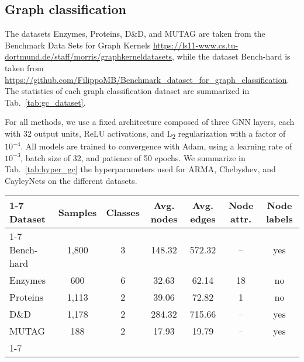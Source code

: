 \documentclass{article}
\begin{document}
\subsection{Graph classification}

The datasets Enzymes, Proteins, D\&D, and MUTAG are taken from the Benchmark Data Sets for Graph Kernels \url{https://ls11-www.cs.tu-dortmund.de/staff/morris/graphkerneldatasets}, while the dataset Bench-hard is taken from \url{https://github.com/FilippoMB/Benchmark_dataset_for_graph_classification}.
The statistics of each graph classification dataset are summarized in Tab.~\ref{tab:gc_dataset}.

For all methods, we use a fixed architecture composed of three GNN layers, each with 32 output units, ReLU activations, and L\textsubscript{2} regularization with a factor of $10^{-4}$. 
All models are trained to convergence with Adam, using a learning rate of $10^{-3}$, batch size of 32, and patience of 50 epochs. 
We summarize in Tab.~\ref{tab:hyper_gc} the hyperparameters used for ARMA, Chebyshev, and CayleyNets on the different datasets. 


\bgroup
\def\arraystretch{1.0} \begin{table*}[!ht]
\small
\centering
\caption{Summary of the graph classification datasets.} 
\label{tab:gc_dataset}
\begin{tabular}{lcccccc}
\cmidrule[1.5pt]{1-7}
\textbf{Dataset} & \textbf{Samples} & \textbf{Classes} & \textbf{Avg. nodes} & \textbf{Avg. edges} & \textbf{Node attr.} & \textbf{Node labels} \\
\cmidrule[.5pt]{1-7}
Bench-hard   & 1,800  & 3  & 148.32 & 572.32 & -- & yes \\
Enzymes      & 600   & 6  & 32.63  & 62.14  & 18 & no  \\
Proteins     & 1,113  & 2  & 39.06  & 72.82  & 1  & no  \\
D\&D         & 1,178  & 2  & 284.32 & 715.66 & -- & yes \\
MUTAG        & 188   & 2  & 17.93  & 19.79  & -- & yes \\
\cmidrule[1.5pt]{1-7}
\end{tabular}
\end{table*}
\egroup
\end{document}
